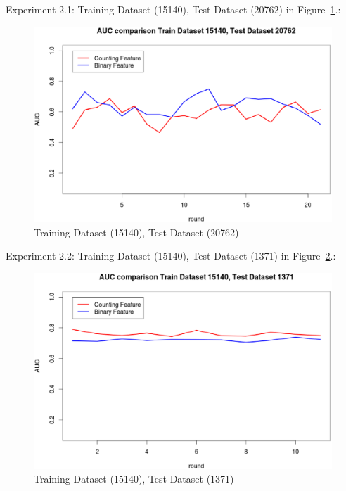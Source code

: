 \documentclass{sig-alternate}
\begin{document}
Experiment 2.1: Training Dataset  (15140), Test Dataset  (20762) in Figure~\ref{fig:fig3}.:
\begin{figure}[h]
\centering
\includegraphics[width=\columnwidth]{15140_20762.eps}
\caption{Training Dataset  (15140), Test Dataset  (20762)}
\label{fig:fig3}
\end{figure}

Experiment 2.2: Training Dataset  (15140), Test Dataset  (1371) in Figure~\ref{fig:fig4}.:
\begin{figure}[h]
\centering
\includegraphics[width=\columnwidth]{15140_1371.eps}
\caption{Training Dataset  (15140), Test Dataset  (1371)}
\label{fig:fig4}
\end{figure}
\end{document}
